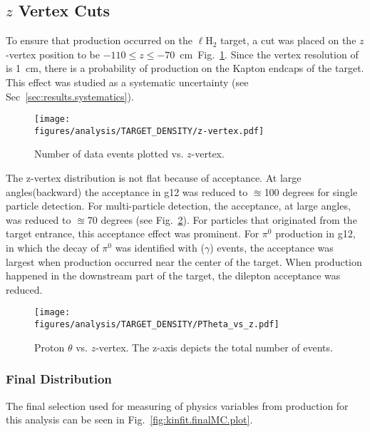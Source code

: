 \FloatBarrier
\subsection{$z$ Vertex Cuts}\label{sec:analysis.zvert}
To ensure that \pizT production occurred on the $\ell$H$_2$ target, a cut was placed on the $z$-vertex position to be $-110 \le z \le -70$~cm~Fig.~\ref{fig:zcut}. Since the vertex resolution of  is 1~cm, there is a probability of \pizT production on the Kapton endcaps of the target. This effect was studied as a systematic uncertainty (see Sec~\ref{sec:results.systematics}). 
\begin{figure}[h!]\begin{center}
\texttt{[image: \\figures/analysis/TARGET\_DENSITY/z-vertex.pdf]}
\caption[Number of data events plotted vs. $z$-vertex]{\label{fig:zcut}Number of data events plotted vs. $z$-vertex.}
\end{center}\end{figure}
The z-vertex distribution is not flat because of acceptance. At large angles(backward) the acceptance in g12 was reduced to $\approxeq$100 degrees for single particle detection. For multi-particle detection, the acceptance, at large angles, was reduced to $\approxeq$70 degrees (see Fig.~\ref{fig:Ptheta_z}). For particles that originated from the target entrance, this acceptance effect was prominent. For $\pi^0$ production in g12, in which the decay of $\pi^0$ was identified with \epemT($\gamma$) events, the acceptance was largest when production occurred near the center of the target. When production happened in the downstream part of the target, the dilepton acceptance was reduced. 

\begin{figure}[h!]\begin{center}
\texttt{[image: \\figures/analysis/TARGET\_DENSITY/PTheta\_vs\_z.pdf]}
\caption[Proton $\theta$ vs. $z$-vertex]{\label{fig:Ptheta_z}Proton $\theta$ vs. $z$-vertex. The z-axis depicts the total number of events.}
\end{center}\end{figure}
\FloatBarrier
\subsubsection{Final  Distribution}\label{sec.final.MC}
The final  selection used for measuring of physics variables from \pizT production for this analysis can be seen in Fig.~\ref{fig:kinfit.finalMC.plot}.

